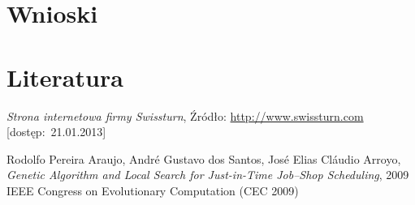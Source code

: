 \documentclass{prezentacja}
\begin{document}
\section{Wnioski}
\begin{frame}
    
\end{frame}
\section{Literatura}
\begin{thebibliography}{1}
\begin{frame}
\emph{Strona internetowa firmy Swissturn},
Źródło: \url{http://www.swissturn.com} [dostęp:~21.01.2013]

Rodolfo Pereira Araujo, André Gustavo dos Santos, José Elias Cláudio Arroyo,
\emph{Genetic Algorithm and Local Search for Just-in-Time Job–Shop Scheduling},
2009 IEEE Congress on Evolutionary Computation (CEC 2009)
\end{frame}
\end{thebibliography}
\end{document}
